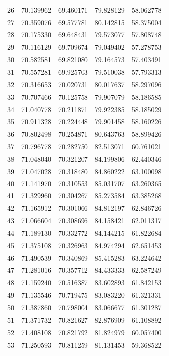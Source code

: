 \begin{table}
\begin{tabular}{rrrrr}
26 & 70.139962 & 69.460171 & 79.828129 & 58.062778 \\
27 & 70.359076 & 69.577781 & 80.142815 & 58.375004 \\
28 & 70.175330 & 69.648431 & 79.573077 & 57.808748 \\
29 & 70.116129 & 69.709674 & 79.049402 & 57.278753 \\
30 & 70.582581 & 69.821080 & 79.164573 & 57.403491 \\
31 & 70.557281 & 69.925703 & 79.510038 & 57.793313 \\
32 & 70.316653 & 70.020731 & 80.017637 & 58.297096 \\
33 & 70.707466 & 70.125758 & 79.907079 & 58.186585 \\
34 & 71.040778 & 70.211871 & 79.922385 & 58.185029 \\
35 & 70.911328 & 70.224448 & 79.901458 & 58.160226 \\
36 & 70.802498 & 70.254871 & 80.643763 & 58.899426 \\
37 & 70.796778 & 70.282750 & 82.513071 & 60.761021 \\
38 & 71.048040 & 70.321207 & 84.199806 & 62.440346 \\
39 & 71.047028 & 70.318480 & 84.860222 & 63.100098 \\
40 & 71.141970 & 70.310553 & 85.031707 & 63.260365 \\
41 & 71.329960 & 70.304267 & 85.273584 & 63.385268 \\
42 & 71.165912 & 70.301066 & 84.812197 & 62.846726 \\
43 & 71.066604 & 70.308696 & 84.158421 & 62.011317 \\
44 & 71.189130 & 70.332772 & 84.144215 & 61.822684 \\
45 & 71.375108 & 70.326963 & 84.974294 & 62.651453 \\
46 & 71.490539 & 70.340869 & 85.415283 & 63.224642 \\
47 & 71.281016 & 70.357712 & 84.433333 & 62.587249 \\
48 & 71.159240 & 70.516387 & 83.602893 & 61.842153 \\
49 & 71.135546 & 70.719475 & 83.083220 & 61.321331 \\
50 & 71.387860 & 70.798004 & 83.066677 & 61.301287 \\
51 & 71.371732 & 70.821627 & 82.876909 & 61.108892 \\
52 & 71.408108 & 70.821792 & 81.824979 & 60.057400 \\
53 & 71.250593 & 70.811259 & 81.131453 & 59.368522 \\

\end{tabular}
\end{table}
